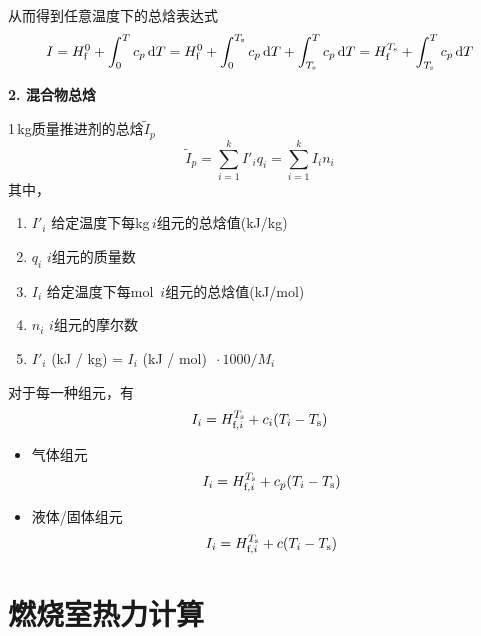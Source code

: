 从而得到任意温度下的总焓表达式
\begin{equation}
	I = H_{\text{f}}^0 + \int_0^T c_p \, {\rm{d}} T = H_{\text{f}}^0 + \int_0^{T_{\text{s}}} c_p \, {\rm{d}} T + \int_{T_{\text{s}}}^{T} c_p \, {\rm{d}} T = H_{\text{f}}^{T_{\text{s}}} + \int_{T_{\text{s}}}^T c_p \, {\rm{d}} T
\end{equation}
\vspace*{0.5em}

\noindent \textbf{2. 混合物总焓}

1$\,$kg质量推进剂的总焓$\tilde{I}_p$
\begin{equation}
	\tilde{I}_p = \sum_{i = 1}^{k} I'_i q_i= \sum_{i = 1}^k I_i n_i
\end{equation}
其中，\vspace*{-0.5em}
\begin{enumerate}[\hspace*{1.5em}]
	\item $I'_i$ \quad 给定温度下每kg$\,i$组元的总焓值(kJ/kg)\vspace*{-0.5em}
	\item $q_i$ \quad $i$组元的质量数\vspace*{-0.5em}
	\item $I_i$ \quad 给定温度下每mol $\,i$组元的总焓值(kJ/mol)\vspace*{-0.5em}
	\item $n_i$ \quad $i$组元的摩尔数\vspace*{-0.5em}
	\item $I'_i\,\,$(kJ / kg) = $I_i\,\,$(kJ / mol) $\,\cdot 1000/M_i$
\end{enumerate}

\noindent 对于每一种组元，有
\begin{equation}
	I_i = H_{\text{f},i}^{T_{\text{s}}} + c_i(T_i - T_{\text{s}})
\end{equation}
\vspace*{-2.5em}
\begin{itemize}
	\item 气体组元
	\begin{equation}
		I_i = H_{\text{f},i}^{T_{\text{s}}} + c_p(T_i - T_{\text{s}})
	\end{equation}
	
	\item 液体/固体组元
	\begin{equation}
		I_i = H_{\text{f},i}^{T_{\text{s}}} + c(T_i - T_{\text{s}})
	\end{equation}
\end{itemize}
\clearpage

\section{燃烧室热力计算}

